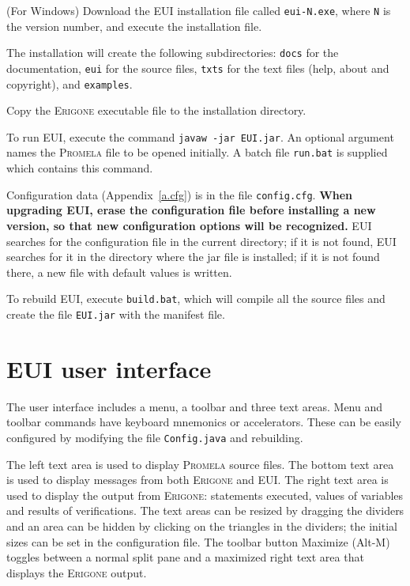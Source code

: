 \documentclass[11pt]{article}
\newcommand{\eri}{\textsc{Erigone}}
\newcommand{\prm}{\textsc{Promela}}
\newcommand{\eui}{\textsc{EUI}}
\newcommand{\p}[1]{\texttt{#1}}
\newcommand{\bu}[1]{\textsf{#1}}
\begin{document}
(For Windows) Download the \eui{} installation file called \p{eui-N.exe},
where \p{N} is the version number, and execute the installation file.

The installation will create the following subdirectories: \p{docs} for the
documentation, \p{eui} for the source files, 
\p{txts} for the text files
(help, about and copyright), and \p{examples}.

Copy the \eri{} executable file to the installation directory.

To run \eui{}, execute the command \p{javaw -jar EUI.jar}.
An optional argument names the \prm{} file to be opened initially.
A batch file \p{run.bat} is supplied which contains this command.

Configuration data (Appendix~\ref{a.cfg}) is in the file
\p{config.cfg}.
\textbf{When upgrading \eui{}, erase the configuration file before installing
a new version, so that new configuration options will be recognized.}
\eui{} searches for the configuration file in the current
directory; if it is not found, \eui{} searches for it in the directory
where the jar file is installed; if it is not found there, a new file
with default values is written.

To rebuild \eui{}, execute \p{build.bat}, which will compile all the source
files and create the file \p{EUI.jar} with the manifest file.

\section{\eui{} user interface}
The user interface includes a menu, a toolbar and three text areas.
Menu and toolbar commands have keyboard mnemonics or accelerators.
These can be easily configured by modifying the file \p{Config.java} and
rebuilding.

The left text area is used to display \prm{} source files. The bottom
text area is used to display messages from both \eri{} and \eui{}. The
right text area is used to display the output from \eri{}: statements
executed, values of variables and results of verifications. The text
areas can be resized by dragging the dividers and an area can be hidden
by clicking on the triangles in the dividers; the initial sizes can be
set in the configuration file. The toolbar button \bu{Maximize}
(\bu{Alt-M}) toggles between a normal split pane and a maximized right
text area that displays the \eri{} output.
\end{document}
